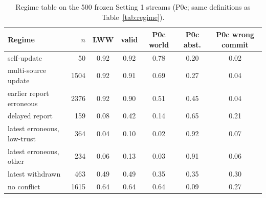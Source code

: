 \begin{table}[t]\centering\small
\caption{Regime table on the 500 frozen Setting 1 streams (P0c; same definitions as Table~\ref{tab:regime}).}\label{tab:regime-s1}
\begin{tabular}{lrccccc}
\toprule
Regime & $n$ & LWW & valid & P0c world & P0c abst. & P0c wrong commit \\
\midrule
self-update & 50 & 0.92 & 0.92 & 0.78 & 0.20 & 0.02 \\
multi-source update & 1504 & 0.92 & 0.91 & 0.69 & 0.27 & 0.04 \\
earlier report erroneous & 2376 & 0.92 & 0.90 & 0.51 & 0.45 & 0.04 \\
delayed report & 159 & 0.08 & 0.42 & 0.14 & 0.65 & 0.21 \\
latest erroneous, low-trust & 364 & 0.04 & 0.10 & 0.02 & 0.92 & 0.07 \\
latest erroneous, other & 234 & 0.06 & 0.13 & 0.03 & 0.91 & 0.06 \\
latest withdrawn & 463 & 0.49 & 0.49 & 0.35 & 0.35 & 0.30 \\
no conflict & 1615 & 0.64 & 0.64 & 0.64 & 0.09 & 0.27 \\
\bottomrule
\end{tabular}
\end{table}